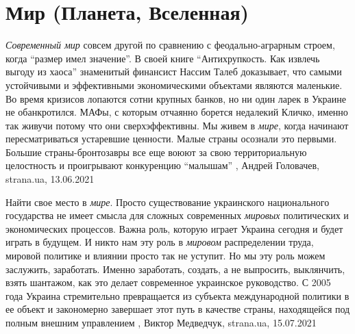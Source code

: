  
 
 
 
 
\chapter{Мир (Планета, Вселенная)}
\label{sec:slova.mir.world}

\emph{Современный мир} совсем другой по сравнению с феодально-аграрным строем, когда
\enquote{размер имел значение}. В своей книге \enquote{Антихрупкость. Как
извлечь выгоду из хаоса} знаменитый финансист Нассим Талеб доказывает, что
самыми устойчивыми и эффективными экономическими объектами являются маленькие.
Во время кризисов лопаются сотни крупных банков, но ни один ларек в Украине не
обанкротился.  МАФы, с которым отчаянно борется недалекий Кличко, именно так
живучи потому что они сверхэффективны.  Мы живем в \emph{мире}, когда начинают
пересматриваться устаревшие ценности. Малые страны осознали это первыми.
Большие страны-бронтозавры все еще воюют за свою территориальную целостность и
проигрывают конкуренцию \enquote{малышам}
, 
Андрей Головачев, strana.ua, 13.06.2021

Найти свое место в \emph{мире}.  Просто существование украинского национального
государства не имеет смысла для сложных современных \emph{мировых} политических и
экономических процессов. Важна роль, которую играет Украина сегодня и будет
играть в будущем. И никто нам эту роль в \emph{мировом} распределении труда, мировой
политике и влиянии просто так не уступит. Но мы эту роль можем заслужить,
заработать. Именно заработать, создать, а не выпросить, выклянчить, взять
шантажом, как это делает современное украинское руководство. С 2005 года
Украина стремительно превращается из субъекта международной политики в ее
объект и закономерно завершает этот путь в качестве страны, находящейся под
полным внешним управлением
, 
Виктор Медведчук, strana.ua, 15.07.2021
